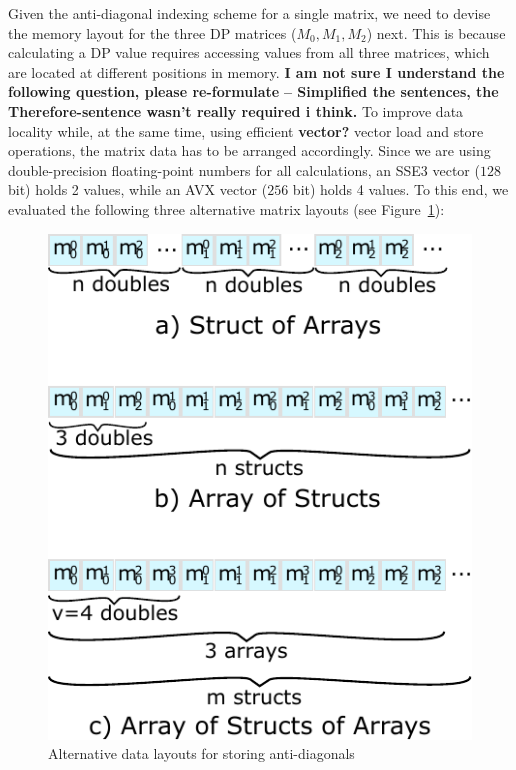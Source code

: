 \documentclass[runningheads,a4paper]{llncs}
\begin{document}
Given the anti-diagonal indexing scheme for a single matrix, we need to 
devise the memory layout for the three DP matrices ($M_0,M_1,M_2$) next.  
This is because calculating a DP value requires 
accessing values from all three matrices, which are located at different
positions in memory.  
{\bf I am not sure I understand the following question, please re-formulate} 
{\bf -- Simplified the sentences, the Therefore-sentence wasn't really required i
think. }
To improve data locality while, at the same time, using efficient {\bf vector?}
vector load and store operations, 
the matrix data has to be arranged accordingly.  Since we are using
double-precision floating-point numbers for all calculations, an SSE3 vector
($128$ bit) holds 2 values, while an AVX vector ($256$ bit) holds 4 values.
To this end, we evaluated the following three alternative matrix layouts (see Figure~\ref{fig:datalayout}):

\begin{figure}[ht!]
  \centering
  \includegraphics[scale=0.7]{figures/datalayout.pdf}
  \caption{Alternative data layouts for storing anti-diagonals}
  \label{fig:datalayout}
\end{figure}
\end{document}
